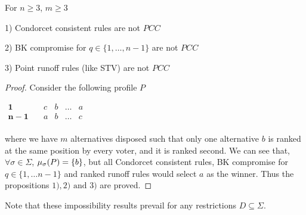 \documentclass[version=3.21, pagesize, twoside=off, bibliography=totoc, DIV=calc, fontsize=12pt, a4paper]{scrartcl}
\begin{document}
\begin{proposition} For $n\geq3$, $m\geq3$  \label{prop:rulesnotPCC}
	\begin{item}
		\item[1)] Condorcet consistent rules are not $PCC$
		\item[2)] BK compromise for $q \in \{1, \dots ,n-1\}$ are not $PCC$
		\item[3)] Point runoff rules (like STV) are not $PCC$
	\end{item}
\end{proposition}
\begin{proof}
	Consider the following profile $P$
	\begin{center}
		$
		\begin{array}{ccccc}
		\mathbf{1} \quad &c&b&\dots &a\\
		\mathbf{n-1} \quad &a&b&\dots &c\\		
		\end{array}
		$
	\end{center}
	where we have $m$ alternatives disposed such that only one alternative $b$ is ranked at the same position by every voter, and it is ranked second.
	We can see that, $\forall \sigma \in \Sigma$, $\mu_{\sigma}(P)=\{b\}$, but all Condorcet consistent rules, BK compromise for $q \in \{1, \dots n-1\}$ and ranked runoff rules would select $a$ as the winner. Thus the propositions $1), 2) \text{ and } 3)$ are proved. 
\end{proof}

\noindent Note that these impossibility results prevail for any restrictions $D \subseteq \Sigma$. 
\end{document}

